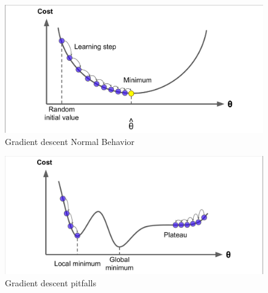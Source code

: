 \documentclass[conference]{IEEEtran}
\begin{document}
\begin{figure}[htbp]
    \includegraphics[scale=0.2]{GradientDescentNormal.jpeg}
    \caption{Gradient descent Normal Behavior\cite{Scikit-Learn}}
    \label{fig:normalbeh}
\end{figure}
\begin{figure}[htbp]
    \includegraphics[scale=0.2]{GradientDescentPitfalls.png}
    \caption{Gradient descent pitfalls\cite{Scikit-Learn}}
    \label{fig:pitfallsbeh}
\end{figure}
\end{document}
